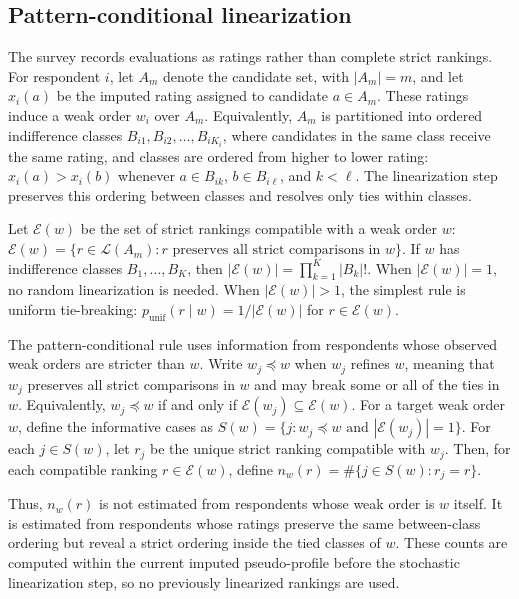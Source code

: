 \documentclass[12pt]{article}
\begin{document}
\subsection{Pattern-conditional linearization}
\label{app:pattern-linearization}

The survey records evaluations as ratings rather than complete strict
rankings. For respondent \(i\), let \(A_m\) denote the candidate set, with
\(|A_m|=m\), and let \(x_i(a)\) be the imputed rating assigned to candidate
\(a\in A_m\). These ratings induce a weak order \(w_i\) over \(A_m\).
Equivalently, \(A_m\) is partitioned into ordered indifference classes
\(B_{i1},B_{i2},\ldots,B_{iK_i}\), where candidates in the same class receive
the same rating, and classes are ordered from higher to lower rating:
\(x_i(a)>x_i(b)\) whenever \(a\in B_{ik}\), \(b\in B_{i\ell}\), and
\(k<\ell\). The linearization step preserves this ordering between classes and
resolves only ties within classes.

Let \(\mathcal E(w)\) be the set of strict rankings compatible with a weak
order \(w\): \(\mathcal E(w)=\{r\in\mathcal L(A_m): r \text{ preserves all
strict comparisons in } w\}\). If \(w\) has indifference classes
\(B_1,\ldots,B_K\), then \(|\mathcal E(w)|=\prod_{k=1}^{K}|B_k|!\). When
\(|\mathcal E(w)|=1\), no random linearization is needed. When
\(|\mathcal E(w)|>1\), the simplest rule is uniform tie-breaking:
\(p_{\mathrm{unif}}(r\mid w)=1/|\mathcal E(w)|\) for
\(r\in\mathcal E(w)\).

The pattern-conditional rule uses information from respondents whose observed
weak orders are stricter than \(w\). Write \(w_j\preceq w\) when \(w_j\)
refines \(w\), meaning that \(w_j\) preserves all strict comparisons in \(w\)
and may break some or all of the ties in \(w\). Equivalently,
\(w_j\preceq w\) if and only if \(\mathcal E(w_j)\subseteq \mathcal E(w)\).
For a target weak order \(w\), define the informative cases as
\(S(w)=\{j:w_j\preceq w \text{ and } |\mathcal E(w_j)|=1\}\). For each
\(j\in S(w)\), let \(r_j\) be the unique strict ranking compatible with
\(w_j\). Then, for each compatible ranking \(r\in\mathcal E(w)\), define
\(n_w(r)=\#\{j\in S(w):r_j=r\}\).

Thus, \(n_w(r)\) is not estimated from respondents whose weak order is \(w\)
itself. It is estimated from respondents whose ratings preserve the same
between-class ordering but reveal a strict ordering inside the tied classes of
\(w\). These counts are computed within the current imputed pseudo-profile
before the stochastic linearization step, so no previously linearized rankings
are used.
\end{document}
